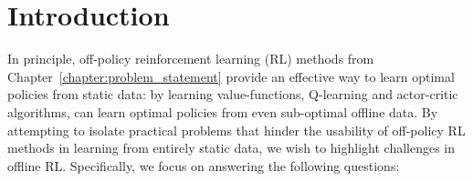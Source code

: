 \vspace{-0.2cm}
\section{Introduction}
\vspace{-0.2cm}

In principle, off-policy reinforcement learning (RL) methods from Chapter~\ref{chapter:problem_statement} provide an effective way to learn optimal policies from static data: by learning value-functions, Q-learning and actor-critic algorithms, can learn optimal policies from even sub-optimal offline data. By attempting to isolate practical problems that hinder the usability of off-policy RL methods in learning from entirely static data, we wish to highlight challenges in offline RL. Specifically, we focus on answering the following questions: 




